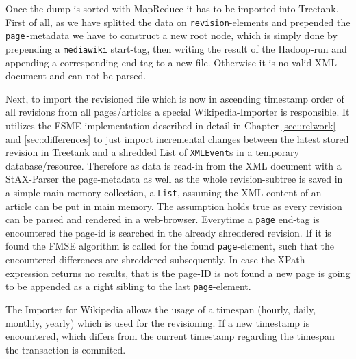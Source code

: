 Once the dump is sorted with MapReduce it has to be imported into Treetank. First of all, as we have splitted the data on \texttt{revision}-elements and pre\-pen\-ded the \texttt{page-}metadata we have to construct a new root node, which is simply done by prepending a \texttt{mediawiki} start-tag, then writing the result of the Hadoop-run and appending a corresponding end-tag to a new file. Otherwise it is no valid XML-document and can not be parsed.

Next, to import the revisioned file which is now in ascending timestamp order of all revisions from all pages/articles a special Wikipedia-Importer is responsible. It utilizes the FSME-implementation described in detail in Chapter \ref{sec::relwork} and \ref{sec::differences} to just import incremental changes between the latest stored revision in Treetank and a shredded List of \texttt{XMLEvent}s in a temporary database/resource. Therefore as data is read-in from the XML document with a StAX-Parser the page-metadata as well as the whole revision-subtree is saved in a simple main-memory collection, a \texttt{List}, assuming the XML-content of an article can be put in main memory. The assumption holds true as every revision can be parsed and rendered in a web-browser. Everytime a \texttt{page} end-tag is encountered the page-id is searched in the already shreddered revision. If it is found the FMSE algorithm is called for the found \texttt{page}-element, such that the encountered differences are shreddered subsequently. In case the XPath expression returns no results, that is the page-ID is not found a new page is going to be appended as a right sibling to the last \texttt{page}-element.

The Importer for Wikipedia allows the usage of a timespan (hourly, daily, monthly, yearly) which is used for the revisioning. If a new timestamp is encountered, which differs from the current timestamp regarding the timespan the transaction is commited.

